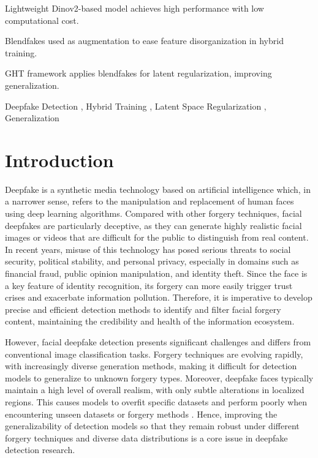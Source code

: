 \documentclass[final,5p,times]{elsarticle}
\begin{document}
\begin{frontmatter}
\begin{highlights}
\item Lightweight Dinov2-based model achieves high performance with low computational cost.
\item Blendfakes used as augmentation to ease feature disorganization in hybrid training.
\item GHT framework applies blendfakes for latent regularization, improving generalization.
\end{highlights}

\begin{keyword}
Deepfake Detection \sep 
Hybrid Training \sep 
Latent Space Regularization  \sep 
Generalization
\end{keyword}

\end{frontmatter}


\section{Introduction}

Deepfake is a synthetic media technology based on artificial intelligence which, in a narrower sense, refers to the manipulation and replacement of human faces using deep learning algorithms. Compared with other forgery techniques, facial deepfakes are particularly deceptive, as they can generate highly realistic facial images or videos that are difficult for the public to distinguish from real content. In recent years, misuse of this technology has posed serious threats to social security, political stability, and personal privacy, especially in domains such as financial fraud, public opinion manipulation, and identity theft. Since the face is a key feature of identity recognition, its forgery can more easily trigger trust crises and exacerbate information pollution. Therefore, it is imperative to develop precise and efficient detection methods to identify and filter facial forgery content, maintaining the credibility and health of the information ecosystem.

However, facial deepfake detection presents significant challenges and differs from conventional image classification tasks. Forgery techniques are evolving rapidly, with increasingly diverse generation methods, making it difficult for detection models to generalize to unknown forgery types. Moreover, deepfake faces typically maintain a high level of overall realism, with only subtle alterations in localized regions. This causes models to overfit specific datasets and perform poorly when encountering unseen datasets or forgery methods \cite{1}. Hence, improving the generalizability of detection models so that they remain robust under different forgery techniques and diverse data distributions is a core issue in deepfake detection research.
\end{document}
